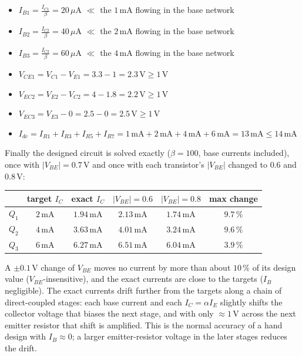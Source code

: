 \documentclass[11pt]{article}
\newcommand{\solstep}[2]{\par\medskip{\color{stepc}\textbf{Step #1 --- #2}}\par\nopagebreak}
\begin{document}
\solstep{4}{Check the design}\begin{itemize}[leftmargin=*,itemsep=2pt]
\item $I_{B1} = \frac{I_{C1}}{\beta} = 20\,\mu \mathrm{A}$ $\ll$ the $1\,\mathrm{m}\mathrm{A}$ flowing in the base network \checkmark
\item $I_{B2} = \frac{I_{C2}}{\beta} = 40\,\mu \mathrm{A}$ $\ll$ the $2\,\mathrm{m}\mathrm{A}$ flowing in the base network \checkmark
\item $I_{B3} = \frac{I_{C3}}{\beta} = 60\,\mu \mathrm{A}$ $\ll$ the $4\,\mathrm{m}\mathrm{A}$ flowing in the base network \checkmark
\item $V_{CE1} = V_{C1} - V_{E1} = 3.3 - 1 = 2.3\,\mathrm{V} \ge 1$\,V \checkmark
\item $V_{EC2} = V_{E2} - V_{C2} = 4 - 1.8 = 2.2\,\mathrm{V} \ge 1$\,V \checkmark
\item $V_{EC3} = V_{E3} - 0 = 2.5 - 0 = 2.5\,\mathrm{V} \ge 1$\,V \checkmark
\item $I_{dc} = I_{R1} + I_{R3} + I_{R5} + I_{R7} = 1\,\mathrm{m}\mathrm{A} + 2\,\mathrm{m}\mathrm{A} + 4\,\mathrm{m}\mathrm{A} + 6\,\mathrm{m}\mathrm{A} = 13\,\mathrm{m}\mathrm{A} \le 14\,\mathrm{m}\mathrm{A}$ \checkmark
\end{itemize}
Finally the designed circuit is solved exactly ($\beta=100$, base currents included), once with $|V_{BE}|=0.7$\,V and once with each transistor's $|V_{BE}|$ changed to $0.6$ and $0.8$\,V:\begin{center}\renewcommand{\arraystretch}{1.35}
\begin{tabular}{cccccc}
\toprule
 & target $I_C$ & exact $I_C$ & $|V_{BE}|=0.6$ & $|V_{BE}|=0.8$ & max change \\
\midrule
$Q_{1}$ & $2\,\mathrm{m}\mathrm{A}$ & $1.94\,\mathrm{m}\mathrm{A}$ & $2.13\,\mathrm{m}\mathrm{A}$ & $1.74\,\mathrm{m}\mathrm{A}$ & $9.7\,\%$ \\
$Q_{2}$ & $4\,\mathrm{m}\mathrm{A}$ & $3.63\,\mathrm{m}\mathrm{A}$ & $4.01\,\mathrm{m}\mathrm{A}$ & $3.24\,\mathrm{m}\mathrm{A}$ & $9.6\,\%$ \\
$Q_{3}$ & $6\,\mathrm{m}\mathrm{A}$ & $6.27\,\mathrm{m}\mathrm{A}$ & $6.51\,\mathrm{m}\mathrm{A}$ & $6.04\,\mathrm{m}\mathrm{A}$ & $3.9\,\%$ \\
\bottomrule
\end{tabular}\end{center}
A $\pm0.1$\,V change of $V_{BE}$ moves no current by more than about $10\,\%$ of its design value ($V_{BE}$-insensitive), and the exact currents are close to the targets ($I_B$ negligible). The exact currents drift further from the targets along a chain of direct-coupled stages: each base current and each $I_C = \alpha I_E$ slightly shifts the collector voltage that biases the next stage, and with only $\approx1$\,V across the next emitter resistor that shift is amplified. This is the normal accuracy of a hand design with $I_B\approx0$; a larger emitter-resistor voltage in the later stages reduces the drift.
\end{document}
